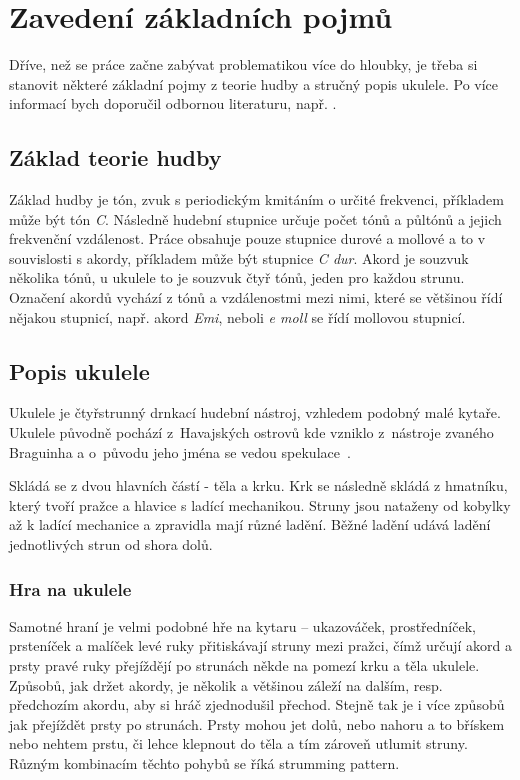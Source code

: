 \chapter{Zavedení základních pojmů}
\label{ch:glosary}
Dříve, než se práce začne zabývat problematikou více do hloubky, je třeba si stanovit některé základní pojmy z teorie hudby a stručný popis ukulele. Po více informací bych doporučil odbornou literaturu, např. \cite[Hudební slovník pro každého]{jirivyslouzil_1995_hudebni}.

\section{Základ teorie hudby}
Základ hudby je tón, zvuk s periodickým kmitáním o určité frekvenci, příkladem může být tón \emph{C}. Následně hudební stupnice určuje počet tónů a půltónů a jejich frekvenční vzdálenost. Práce obsahuje pouze stupnice durové a mollové a to v souvislosti s akordy, příkladem může být stupnice \emph{C dur}. Akord je souzvuk několika tónů, u ukulele to je souzvuk čtyř tónů, jeden pro každou strunu. Označení akordů vychází z tónů a vzdálenostmi mezi nimi, které se většinou řídí nějakou stupnicí, např. akord \emph{Emi}, neboli \emph{e moll} se řídí mollovou stupnicí.

\section{Popis ukulele}
\label{sc:ukulele_description}
Ukulele je čtyřstrunný drnkací hudební nástroj, vzhledem podobný malé kytaře. Ukulele původně pochází z~Havajských ostrovů kde vzniklo z~nástroje zvaného Braguinha a o~původu jeho jména se vedou spekulace~\cite{rek_2008_kola}.

Skládá se z dvou hlavních částí - těla a krku. Krk se následně skládá z hmatníku, který tvoří pražce a hlavice s ladící mechanikou. Struny jsou nataženy od kobylky až k ladící mechanice a zpravidla mají různé ladění. Běžné ladění udává ladění jednotlivých strun od shora dolů.

\subsection{Hra na ukulele}
Samotné hraní je velmi podobné hře na kytaru –⁠ ukazováček, prostředníček, prsteníček a malíček levé ruky přitiskávají struny mezi pražci, čímž určují akord a prsty pravé ruky přejíždějí po strunách někde na pomezí krku a těla ukulele. Způsobů, jak držet akordy, je několik a většinou záleží na dalším, resp. předchozím akordu, aby si hráč zjednodušil přechod. Stejně tak je i více způsobů jak přejíždět prsty po strunách. Prsty mohou jet dolů, nebo nahoru a to břískem nebo nehtem prstu, či lehce klepnout do těla a tím zároveň utlumit struny. Různým kombinacím těchto pohybů se říká strumming pattern.

